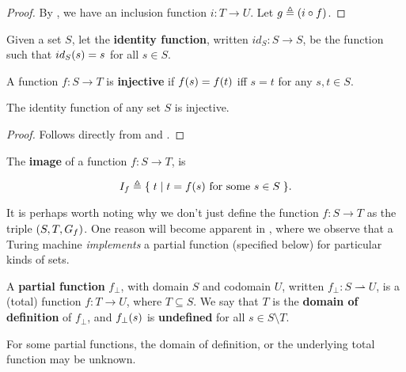 \begin{proof} By , we have an inclusion function $i : T
\rightarrow U$. Let $g \triangleq \mathopen{}\left({i\circ f}\right)\mathclose{}$. \end{proof}

\begin{definition} \label{def:id-fun} Given a set $S$, let the \textbf{identity
function}, written $id_S: S \rightarrow S$, be the function such that
$id_S\mathopen{}\left({s}\right)\mathclose{}=s$ for all $s\in S$. \end{definition}

\begin{definition} \label{def:injective} A function $f : S \rightarrow T$ is
\textbf{injective} if $f\mathopen{}\left({s}\right)\mathclose{}=f\mathopen{}\left({t}\right)\mathclose{}$ iff $s=t$ for any $s,t\in S$.
\end{definition}

\begin{corollary} \label{cor:id-is-injective} The identity function of any set
$S$ is injective.  \end{corollary}

\begin{proof} Follows directly from  and .
\end{proof}

\begin{definition} \label{def:image} The \textbf{image} of a function $f : S
\rightarrow T$, is

$$I_f \triangleq \mathopen{}\left\{\mathrel{}{t\mathrel{}\mid\mathrel{}{\text{$t=f\mathopen{}\left({s}\right)\mathclose{}$ for some $s\in S$}}}\mathrel{}\right\}\mathclose{}.$$

\end{definition}

It is perhaps worth noting why we don't just define the function $f : S
\rightarrow T$ as the triple $\mathopen{}\left({S, T, G_f}\right)\mathclose{}$.  One reason will become apparent
in , where we observe that a Turing
machine \emph{implements} a partial function (specified below) for particular
kinds of sets.

\begin{specification} \label{spec:partial-function} A \textbf{partial function}
$f_\bot$, with domain $S$ and codomain $U$, written $f_\bot : S \rightharpoonup
U$, is a (total) function $f : T \rightarrow U$, where $T\subseteq S$. We say
that $T$ is the \textbf{domain of definition} of $f_\bot$, and $f_\bot\mathopen{}\left({s}\right)\mathclose{}$
is \textbf{undefined} for all $s \in S \setminus T$.\end{specification}

\begin{remark} For some partial functions, the domain of definition, or the
underlying total function may be unknown. \end{remark}

